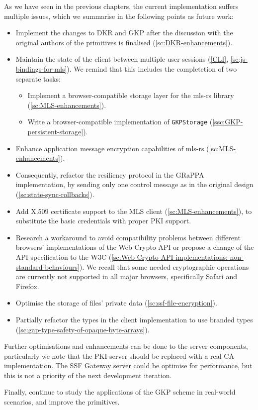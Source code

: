 As we have seen in the previous chapters,
the current implementation suffers multiple issues,
which we summarise in the following points as future work:
\begin{itemize}
    \item Implement the changes to DKR and GKP after the discussion with the original authors of the primitives is finalised (\cref{sc:DKR-enhancements}).
    \item Maintain the state of the client between multiple user sessions (\cref{CLI}, \cref{sc:js-bindings-for-mls}). We remind that this includes the completetion of two separate tasks:
    \begin{itemize}
        \item Implement a browser-compatible storage layer for the mls-rs library (\cref{sc:MLS-enhancements}).
        \item Write a browser-compatible implementation of \texttt{GKPStorage} (\cref{ssc:GKP-persistent-storage}).
    \end{itemize}
    \item Enhance application message encryption capabilities of mls-rs (\cref{sc:MLS-enhancements}).
    \item Consequently, refactor the resiliency protocol in the GRaPPA implementation, by sending only one control message as in the original design (\cref{sc:state-sync-rollbacks}).
    \item Add X.509 certificate support to the MLS client (\cref{sc:MLS-enhancements}), to substitute the basic credentials with proper PKI support.
    \item Research a workaround to avoid compatibility problems between different browsers' implementations of the Web Crypto API or propose a change of the API specification to the W3C  (\cref{sc:Web-Crypto-API-implementations:-non-standard-behaviours}). We recall that some needed cryptographic operations are currently not supported in all major browsers, specifically Safari and Firefox. 
    \item Optimise the storage of files' private data (\cref{sc:ssf-file-encryption}).
    \item Partially refactor the types in the client implementation to use branded types (\cref{sc:gap-type-safety-of-opaque-byte-arrays}).
\end{itemize}

Further optimisations and enhancements can be done
to the server components, particularly we note that
the PKI server should be replaced with a real CA
implementation. The SSF Gateway server could be optimise
for performance, but this is not a priority of the
next development iteration.

Finally, continue to study the applications of the GKP scheme in
real-world scenarios, and improve the primitives.
